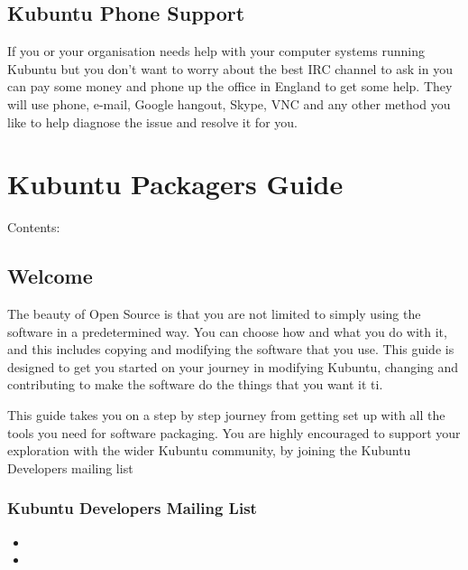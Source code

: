 \documentclass[letterpaper,10pt,english]{sphinxmanual}
\begin{document}
\section{Kubuntu Phone Support}
\label{\detokenize{docs/support:kubuntu-phone-support}}
If you or your organisation needs help with your computer systems running Kubuntu but you don't want to worry about the best IRC channel to ask in you can pay some money and phone up the office in England to get some help. They will use phone, e-mail, Google hangout, Skype, VNC and any other method you like to help diagnose the issue and resolve it for you.



\chapter{Kubuntu Packagers Guide}
\label{\detokenize{docs/packaging_guide/packaging::doc}}\label{\detokenize{docs/packaging_guide/packaging:kubuntu-packagers-guide}}
Contents:


\section{Welcome}
\label{\detokenize{docs/packaging_guide/welcome::doc}}\label{\detokenize{docs/packaging_guide/welcome:welcome}}
The beauty of Open Source is that you are not limited to simply using the software in a predetermined way. You can choose how and what you do with it, and this includes copying and modifying the software that you use.
This guide is designed to get you started on your journey in modifying Kubuntu, changing and contributing to make the software do the things that you want it ti.

This guide takes you on a step by step journey from getting set up with all the tools you need for software packaging. You are highly encouraged to support your exploration with the wider Kubuntu community, by joining the Kubuntu Developers mailing list


\subsection{Kubuntu Developers Mailing List}
\label{\detokenize{docs/packaging_guide/welcome:kubuntu-developers-mailing-list}}\begin{itemize}
\item {} 

\item {} 

\end{itemize}
\end{document}
